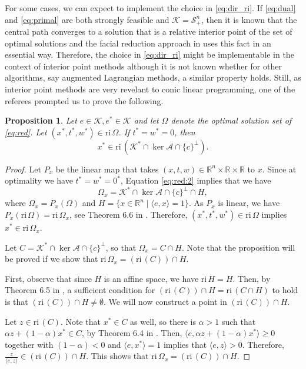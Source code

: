 \documentclass{article}
\newcommand{\reInt}{\mathrm{ri}\,}
\newcommand{\inProd}[2]{\langle #1 , #2 \rangle }
\newcommand{\PSDcone}[1]{{\mathcal{S}^{#1}_+}}
\newcommand{\stdMap}{ {\mathcal{A}}}
\newcommand{\stdCone}{ {\mathcal{K}}}
\newcommand{\stdInt}{ {e}}
\renewcommand{\Re}{\mathbb{R}}
\newtheorem{proposition}[definition]{Proposition}
\begin{document}
For some cases, we can expect to implement the choice in \eqref{eq:dir_ri}. 
If  \eqref{eq:dual} and \eqref{eq:primal} are both 
strongly feasible and $\stdCone = \PSDcone{n}$, then it is known that the central path converges 
to a solution that is a relative interior point of the set of optimal solutions \cite{KRT97} and 
the facial reduction approach in \cite{PFA15} uses this fact in an essential way.
Therefore, the choice in \eqref{eq:dir_ri} might be implementable in the context of 
interior point methods although it is not known whether for other algorithms, say augmented Lagrangian methods, a similar property holds.
Still, as interior point methods are very revelant to conic linear programming, one of the referees prompted us to prove the following. 

\begin{proposition}
Let $\stdInt \in \stdCone, \stdInt^* \in \stdCone$ and 
let $\Omega$ denote the optimal solution set of \eqref{eq:red}.
Let  $(x^*,t^*,w^*) \in \reInt \Omega$. If $t^* = w^* = 0$, then  
$$
x^* \in \reInt (\stdCone ^*\cap \ker \stdMap \cap \{c\}^\perp).
$$
\end{proposition}
\begin{proof}
Let $P_x$ be the linear map that takes $(x,t,w) \in \Re^n \times \Re \times \Re$ to $x$.
Since at optimality we have $t^* = w^* = 0^*$, Equation \eqref{eq:red:2} implies that we have
$$
\Omega _x = \stdCone ^*\cap \ker \stdMap \cap \{c\}^\perp \cap H,
$$
where $\Omega _x = P_x(\Omega) $ and $H = \{x \in \Re^n \mid \inProd{e}{x} = 1\}$.
As $P_x$ is linear, we have $P_x(\reInt \Omega) = \reInt \Omega _x$, see 
Theorem 6.6 in \cite{rockafellar}. Therefore,  $(x^*,t^*,w^*) \in \reInt \Omega$ implies $x^* \in \reInt \Omega _x$.

Let $C = \stdCone ^*\cap \ker \stdMap \cap \{c\}^\perp $, so that $\Omega _x = C\cap H$.
Note that the proposition will be proved if we show that $\reInt \Omega _x = (\reInt (C)) \cap H$.

First, observe that since $H$ is an affine space, we have $\reInt H = H$. Then, by 
Theorem 6.5 in \cite{rockafellar}, a sufficient condition for $(\reInt (C)) \cap H = 
\reInt(C\cap H)$ to hold is that $(\reInt (C) )\cap H \neq \emptyset $. We will now construct a point in $(\reInt (C) )\cap H$.

Let $z \in \reInt(C)$. Note that $x^* \in C$ as well, so there is 
$\alpha > 1$ such that $\alpha z + (1-\alpha)x^* \in C$, by Theorem 6.4 in \cite{rockafellar}. Then, $\inProd{\stdInt}{\alpha z + (1-\alpha)x^*} \geq 0 $ together with $(1-\alpha ) < 0$ and $\inProd{e}{x^*} = 1$ implies that $\inProd{e}{z} > 0$. 
Therefore, $\frac{z}{\inProd{e}{z}} \in (\reInt (C)) \cap H$.
This shows that
$
\reInt \Omega _x = (\reInt (C)) \cap H.
$
\end{proof}
\end{document}

